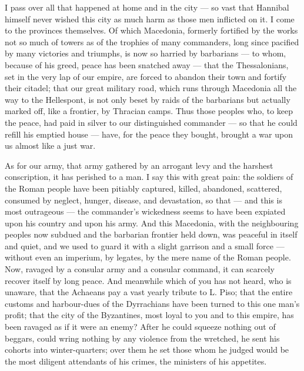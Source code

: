  I pass over all that happened at home and in the city --- so vast that Hannibal himself never wished this city as much harm as those men inflicted on it. I come to the provinces themselves. Of which Macedonia, formerly fortified by the works not so much of towers as of the trophies of many commanders, long since pacified by many victories and triumphs, is now so harried by barbarians --- to whom, because of his greed, peace has been snatched away --- that the Thessalonians, set in the very lap of our empire, are forced to abandon their town and fortify their citadel; that our great military road, which runs through Macedonia all the way to the Hellespont, is not only beset by raids of the barbarians but actually marked off, like a frontier, by Thracian camps. Thus those peoples who, to keep the peace, had paid in silver to our distinguished commander --- so that he could refill his emptied house --- have, for the peace they bought, brought a war upon us almost like a just war.

 As for our army, that army gathered by an arrogant levy and the harshest conscription, it has perished to a man. I say this with great pain: the soldiers of the Roman people have been pitiably captured, killed, abandoned, scattered, consumed by neglect, hunger, disease, and devastation, so that --- and this is most outrageous --- the commander's wickedness seems to have been expiated upon his country and upon his army. And this Macedonia, with the neighbouring peoples now subdued and the barbarian frontier held down, was peaceful in itself and quiet, and we used to guard it with a slight garrison and a small force --- without even an imperium, by legates, by the mere name of the Roman people. Now, ravaged by a consular army and a consular command, it can scarcely recover itself by long peace. And meanwhile which of you has not heard, who is unaware, that the Achaeans pay a vast yearly tribute to L. Piso; that the entire customs and harbour-dues of the Dyrrachians have been turned to this one man's profit; that the city of the Byzantines, most loyal to you and to this empire, has been ravaged as if it were an enemy? After he could squeeze nothing out of beggars, could wring nothing by any violence from the wretched, he sent his cohorts into winter-quarters; over them he set those whom he judged would be the most diligent attendants of his crimes, the ministers of his appetites.

